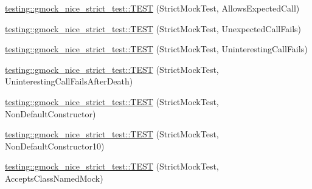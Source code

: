 \begin{DoxyCompactItemize}
\item 
\hyperlink{namespacetesting_1_1gmock__nice__strict__test_a269b7756fb785a84a609543700f77256}{testing\+::gmock\+\_\+nice\+\_\+strict\+\_\+test\+::\+T\+E\+ST} (Strict\+Mock\+Test, Allows\+Expected\+Call)
\item 
\hyperlink{namespacetesting_1_1gmock__nice__strict__test_ae58ab074e0f9218a727d1fec0793667e}{testing\+::gmock\+\_\+nice\+\_\+strict\+\_\+test\+::\+T\+E\+ST} (Strict\+Mock\+Test, Unexpected\+Call\+Fails)
\item 
\hyperlink{namespacetesting_1_1gmock__nice__strict__test_afea105507ce78fc0e2c20d9f4cca16d7}{testing\+::gmock\+\_\+nice\+\_\+strict\+\_\+test\+::\+T\+E\+ST} (Strict\+Mock\+Test, Uninteresting\+Call\+Fails)
\item 
\hyperlink{namespacetesting_1_1gmock__nice__strict__test_a04e9402fd03549e1eda88659b6eac174}{testing\+::gmock\+\_\+nice\+\_\+strict\+\_\+test\+::\+T\+E\+ST} (Strict\+Mock\+Test, Uninteresting\+Call\+Fails\+After\+Death)
\item 
\hyperlink{namespacetesting_1_1gmock__nice__strict__test_a21456158013d707a1238d0ade00ea3f6}{testing\+::gmock\+\_\+nice\+\_\+strict\+\_\+test\+::\+T\+E\+ST} (Strict\+Mock\+Test, Non\+Default\+Constructor)
\item 
\hyperlink{namespacetesting_1_1gmock__nice__strict__test_ae52f11a6045e9c307237cf02b85e6b79}{testing\+::gmock\+\_\+nice\+\_\+strict\+\_\+test\+::\+T\+E\+ST} (Strict\+Mock\+Test, Non\+Default\+Constructor10)
\item 
\hyperlink{namespacetesting_1_1gmock__nice__strict__test_a4534bdd7c8ca19aad56933d34e0ea4db}{testing\+::gmock\+\_\+nice\+\_\+strict\+\_\+test\+::\+T\+E\+ST} (Strict\+Mock\+Test, Accepts\+Class\+Named\+Mock)
\end{DoxyCompactItemize}
